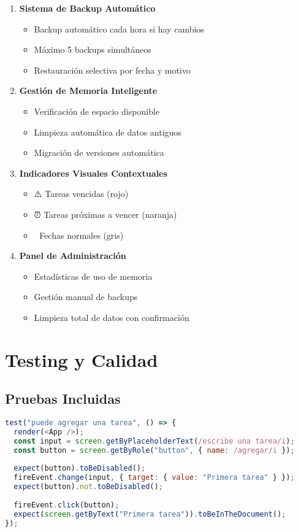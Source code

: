 \documentclass[12pt,a4paper]{article}
\begin{document}
\begin{enumerate}
  \item \textbf{Sistema de Backup Automático}
  \begin{itemize}
    \item Backup automático cada hora si hay cambios
    \item Máximo 5 backups simultáneos
    \item Restauración selectiva por fecha y motivo
  \end{itemize}

  \item \textbf{Gestión de Memoria Inteligente}
  \begin{itemize}
    \item Verificación de espacio disponible
    \item Limpieza automática de datos antiguos
    \item Migración de versiones automática
  \end{itemize}

  \item \textbf{Indicadores Visuales Contextuales}
  \begin{itemize}
    \item ⚠️ Tareas vencidas (rojo)
    \item ⏰ Tareas próximas a vencer (naranja)
    \item 📅 Fechas normales (gris)
  \end{itemize}

  \item \textbf{Panel de Administración}
  \begin{itemize}
    \item Estadísticas de uso de memoria
    \item Gestión manual de backups
    \item Limpieza total de datos con confirmación
  \end{itemize}
\end{enumerate}

\section{Testing y Calidad}

\subsection{Pruebas Incluidas}
\begin{lstlisting}[language=JavaScript,caption={Ejemplo de test unitario}]
test("puede agregar una tarea", () => {
  render(<App />);
  const input = screen.getByPlaceholderText(/escribe una tarea/i);
  const button = screen.getByRole("button", { name: /agregar/i });
  
  expect(button).toBeDisabled();
  fireEvent.change(input, { target: { value: "Primera tarea" } });
  expect(button).not.toBeDisabled();
  
  fireEvent.click(button);
  expect(screen.getByText("Primera tarea")).toBeInTheDocument();
});
\end{lstlisting}
\end{document}
